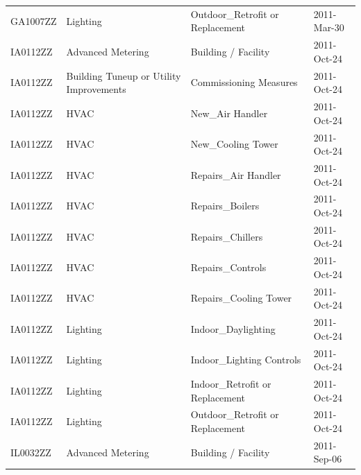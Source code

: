\documentclass[12pt]{article}
\begin{document}
\begin{longtable}{lp{4cm}p{4cm}p{3cm}}
GA1007ZZ         & Lighting                                & Outdoor\_Retrofit or Replacement          & 2011-Mar-30                   \\
IA0112ZZ         & Advanced Metering                       & Building / Facility                       & 2011-Oct-24                   \\
IA0112ZZ         & Building Tuneup or Utility Improvements & Commissioning Measures                    & 2011-Oct-24                   \\
IA0112ZZ         & HVAC                                    & New\_Air Handler                          & 2011-Oct-24                   \\
IA0112ZZ         & HVAC                                    & New\_Cooling Tower                        & 2011-Oct-24                   \\
IA0112ZZ         & HVAC                                    & Repairs\_Air Handler                      & 2011-Oct-24                   \\
IA0112ZZ         & HVAC                                    & Repairs\_Boilers                          & 2011-Oct-24                   \\
IA0112ZZ         & HVAC                                    & Repairs\_Chillers                         & 2011-Oct-24                   \\
IA0112ZZ         & HVAC                                    & Repairs\_Controls                         & 2011-Oct-24                   \\
IA0112ZZ         & HVAC                                    & Repairs\_Cooling Tower                    & 2011-Oct-24                   \\
IA0112ZZ         & Lighting                                & Indoor\_Daylighting                       & 2011-Oct-24                   \\
IA0112ZZ         & Lighting                                & Indoor\_Lighting Controls                 & 2011-Oct-24                   \\
IA0112ZZ         & Lighting                                & Indoor\_Retrofit or Replacement           & 2011-Oct-24                   \\
IA0112ZZ         & Lighting                                & Outdoor\_Retrofit or Replacement          & 2011-Oct-24                   \\
IL0032ZZ         & Advanced Metering                       & Building / Facility                       & 2011-Sep-06                   \\

\end{longtable}
\end{document}
